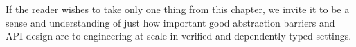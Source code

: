 If the reader wishes to take only one thing from this chapter, we invite it to be a sense and understanding of just how important good abstraction barriers and API design are to engineering at scale in verified and dependently-typed settings.

\begin{comment}
\clearpage

\todo{mention frowned-upon Perl scripts previously in BoringSSL(?) OpenSSL?; (ask Andres for reference?)} Perl scripts were complicated, a number of steps removed from actual running code, hard to maintain and verify.
\todo{Refer back to representation changes (good abstraction barriers / equivalences) being important in fiat-crypto, and being cheap only because we have a rewriter}
\setlistdepth{20}
\renewlist{itemize}{itemize}{20}%
\setlist[itemize,1]{label=\textbullet}%
\setlist[itemize,2]{label=\normalfont \bfseries \textendash}%
\setlist[itemize,3]{label=\textasteriskcentered}%
\setlist[itemize,4]{label=\textperiodcentered}%
\setlist[itemize,5]{label=\textbullet}%
\setlist[itemize,6]{label=\normalfont \bfseries \textendash}%
\setlist[itemize,7]{label=\textasteriskcentered}%
\setlist[itemize,8]{label=\textperiodcentered}%
\setlist[itemize,9]{label=\textbullet}%
\setlist[itemize,10]{label=\normalfont \bfseries \textendash}%
\setlist[itemize,11]{label=\textasteriskcentered}%
\setlist[itemize,12]{label=\textperiodcentered}%
\setlist[itemize,13]{label=\textbullet}%
\setlist[itemize,14]{label=\normalfont \bfseries \textendash}%
\setlist[itemize,15]{label=\textasteriskcentered}%
\setlist[itemize,16]{label=\textperiodcentered}%
\setlist[itemize,17]{label=\textbullet}%
\setlist[itemize,18]{label=\normalfont \bfseries \textendash}%
\setlist[itemize,19]{label=\textasteriskcentered}%
\setlist[itemize,20]{label=\textperiodcentered}%


\end{comment}
%
